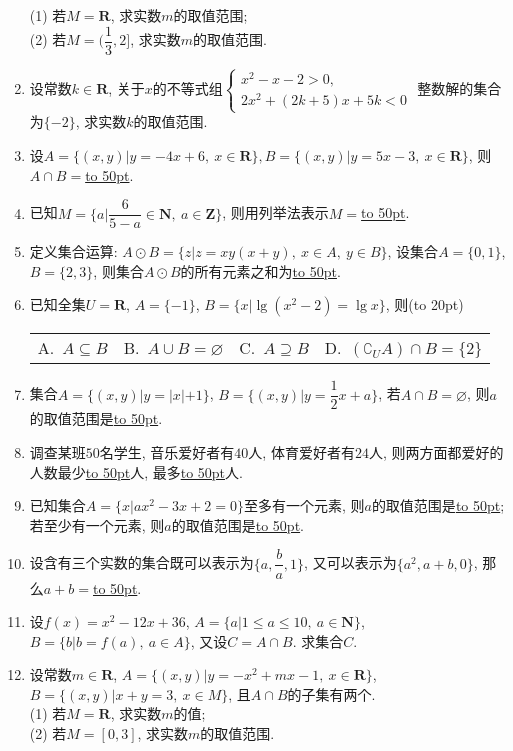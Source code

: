 \documentclass[10pt,a4paper]{article}
\newcommand{\blank}[1]{\underline{\hbox to #1pt{}}}
\newcommand{\bracket}[1]{(\hbox to #1pt{})}
\newcommand{\fourch}[4]{\par\begin{tabular}{p{.23\textwidth}p{.23\textwidth}p{.23\textwidth}p{.23\textwidth}}
A.~#1 &B.~#2& C.~#3& D.~#4
\end{tabular}}
\begin{document}
\begin{enumerate}[1.]
(1) 若$M=\mathbf{R}$, 求实数$m$的取值范围;\\
(2) 若$M=(\dfrac13,2]$, 求实数$m$的取值范围.
\item 设常数$k\in \mathbf{R}$, 关于$x$的不等式组$\begin{cases} x^2-x-2>0, \\ 2x^2+(2k+5)x+5k<0 \end{cases}$ 整数解的集合为$\{-2\}$, 求实数$k$的取值范围.
\item 设$A=\{(x,y)|y=-4x+6,\ x\in \mathbf{R}\}, B=\{(x,y)|y=5x-3,\ x\in \mathbf{R}\}$, 则$A\cap B=$\blank{50}.
\item 已知$M=\{a|\dfrac6{5-a}\in \mathbf{N}, \ a\in \mathbf{Z}\}$, 则用列举法表示$M=$\blank{50}.
\item 定义集合运算: $A\odot B=\{z|z=xy(x+y), \ x\in A, \ y\in B \}$, 设集合$A=\{0,1\}$, $B=\{2,3\}$, 则集合$A\odot B$的所有元素之和为\blank{50}.
\item 已知全集$U=\mathbf{R}$, $A=\{-1\}$, $B=\{x|\lg (x^2-2)=\lg x\}$, 则\bracket{20}
\fourch{$A\subseteq B$}{$A\cup B=\varnothing$}{$A\supseteq B$}{$(\complement_U A)\cap B=\{2\}$}
\item 集合$A=\{(x,y)|y=|x|+1\}$, $B=\{(x,y)|y=\dfrac12x+a\}$, 若$A\cap B=\varnothing$, 则$a$的取值范围是\blank{50}.
\item 调查某班$50$名学生, 音乐爱好者有$40$人, 体育爱好者有$24$人, 则两方面都爱好的人数最少\blank{50}人, 最多\blank{50}人.
\item 已知集合$A=\{x|ax^2-3x+2=0\}$至多有一个元素, 则$a$的取值范围是\blank{50}; 若至少有一个元素, 则$a$的取值范围是\blank{50}.
\item 设含有三个实数的集合既可以表示为$\{a,\dfrac ba,1\}$, 又可以表示为$\{a^2,a+b,0\}$, 那么$a+b=$\blank{50}.
\item 设$f(x)=x^2-12x+36$, $A=\{a|1\le a\le 10, \ a\in \mathbf{N}\}$, $B=\{b|b=f(a),\ a\in A\}$, 又设$C=A\cap B$. 求集合$C$.
\item 设常数$m\in \mathbf{R}$, $A=\{(x,y)|y=-x^2+mx-1,\ x\in \mathbf{R}\}$, $B=\{(x,y)|x+y=3,\ x\in M\}$, 且$A\cap B$的子集有两个.\\
(1) 若$M=\mathbf{R}$, 求实数$m$的值;\\
(2) 若$M=[0,3]$, 求实数$m$的取值范围.



\end{enumerate}
\end{document}
